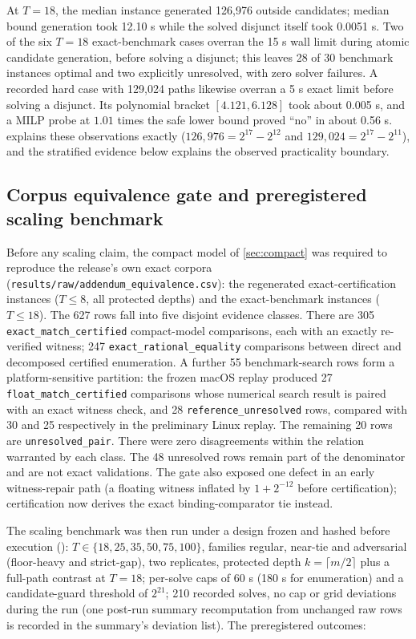 \documentclass[11pt]{article}
\theoremstyle{definition}
\begin{document}
At $T=18$, the median instance generated 126,976 outside candidates; median bound generation took 12.10 s while the solved disjunct itself took 0.0051 s. Two of the six $T=18$ exact-benchmark cases overran the 15 s wall limit during atomic candidate generation, before solving a disjunct; this leaves 28 of 30 benchmark instances optimal and two explicitly unresolved, with zero solver failures. A recorded hard case with 129,024 paths likewise overran a 5 s exact limit before solving a disjunct. Its polynomial bracket $[4.121,6.128]$ took about 0.005 s, and a MILP probe at $1.01$ times the safe lower bound proved ``no'' in about 0.56 s.  explains these observations exactly ($126{,}976=2^{17}-2^{12}$ and $129{,}024=2^{17}-2^{11}$), and the stratified evidence below explains the observed practicality boundary.

\subsection*{Corpus equivalence gate and preregistered scaling benchmark}

Before any scaling claim, the compact model of \cref{sec:compact} was
required to reproduce the release's own exact corpora
(\texttt{results/raw/addendum\_equivalence.csv}): the regenerated
exact-certification instances ($T\le8$, all protected depths) and the
exact-benchmark instances ($T\le18$). The 627 rows fall into five disjoint evidence classes. There are 305
\texttt{exact\_match\_certified} compact-model comparisons, each with an
exactly re-verified witness; 247 \texttt{exact\_rational\_equality}
comparisons between direct and decomposed certified enumeration. A further 55
benchmark-search rows form a platform-sensitive partition: the frozen macOS
replay produced 27 \texttt{float\_match\_certified} comparisons whose numerical
search result is paired with an exact witness check, and 28
\texttt{reference\_unresolved} rows, compared with 30 and 25 respectively in
the preliminary Linux replay. The remaining 20 rows are
\texttt{unresolved\_pair}. There were zero disagreements within the relation
warranted by each class. The 48 unresolved rows remain part of the denominator
and are not exact validations.
The gate also exposed one defect in an early witness-repair path (a floating
witness inflated by $1+2^{-12}$ before certification); certification now
derives the exact binding-comparator tie instead.

The scaling benchmark was then run under a design frozen and hashed
before execution ():
$T\in\{18,25,35,50,75,100\}$, families regular, near-tie and adversarial
(floor-heavy and strict-gap), two replicates, protected depth
$k=\lceil m/2\rceil$ plus a full-path contrast at $T=18$; per-solve caps
of 60 s (180 s for enumeration) and a candidate-guard threshold of
$2^{21}$; 210 recorded solves, no cap or grid deviations during the run
(one post-run summary recomputation from unchanged raw rows is recorded
in the summary's deviation list). The preregistered outcomes:
\end{document}
